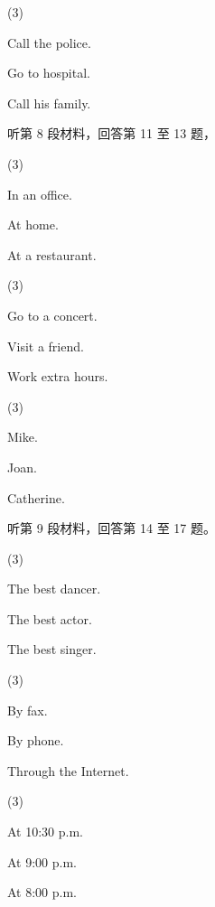 \documentclass{英语试卷}
\begin{document}
\begin{choices}(3)
  \item Call the police.
  \item Go to hospital.
  \item Call his family.
\end{choices}
\par 听第 8 段材料，回答第 11 至 13 题，\par
{}
\begin{choices}(3)
  \item In an office.
  \item At home.
  \item At a restaurant.
\end{choices}
\begin{choices}(3)
  \item Go to a concert.
  \item Visit a friend.
  \item Work extra hours.
\end{choices}
\begin{choices}(3)
  \item Mike.
  \item Joan.
  \item Catherine.
\end{choices}
\par 听第 9 段材料，回答第 14 至 17 题。\par
{}
\begin{choices}(3)
  \item The best dancer.
  \item The best actor.
  \item The best singer.
\end{choices}
\begin{choices}(3)
  \item By fax.
  \item By phone.
  \item Through the Internet.
\end{choices}
\begin{choices}(3)
  \item At 10:30 p.m.
  \item At 9:00 p.m.
  \item At 8:00 p.m.
\end{choices}
\end{document}
